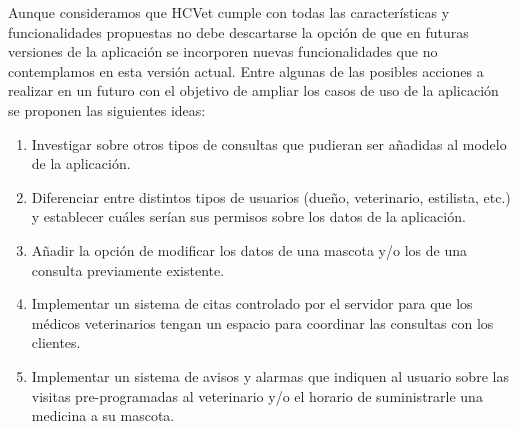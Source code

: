 \begin{recomendations}
    Aunque consideramos que HCVet cumple con todas las características y funcionalidades propuestas no debe descartarse la opción de que en futuras versiones de la aplicación se incorporen nuevas funcionalidades que no contemplamos en esta versión actual. Entre algunas de las posibles acciones a realizar en un futuro con el objetivo de ampliar los casos de uso de la aplicación se proponen las siguientes ideas:

\begin{enumerate}


\item Investigar sobre otros tipos de consultas que pudieran ser añadidas al modelo de la aplicación.

\item Diferenciar entre distintos tipos de usuarios (dueño, veterinario, estilista, etc.) y establecer cuáles serían sus permisos sobre los datos de la aplicación.

\item Añadir la opción de modificar los datos de una mascota y/o los de una consulta previamente existente.

\item Implementar un sistema de citas controlado por el servidor para que los médicos veterinarios tengan un espacio para coordinar las consultas con los clientes.

\item Implementar un sistema de avisos y alarmas que indiquen al usuario sobre las visitas pre-programadas al veterinario y/o el horario de suministrarle una medicina a su mascota.
\end{enumerate}
\end{recomendations}
